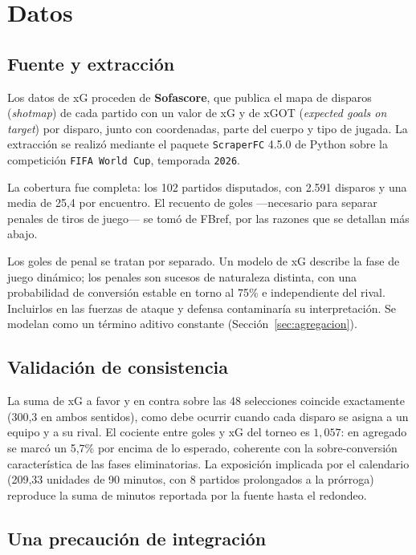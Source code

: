\documentclass[11pt,a4paper]{article}
\begin{document}
\section{Datos}

\subsection{Fuente y extracción}

Los datos de xG proceden de \textbf{Sofascore}, que publica el mapa de disparos (\textit{shotmap}) de cada partido con un valor de xG y de xGOT (\textit{expected goals on target}) por disparo, junto con coordenadas, parte del cuerpo y tipo de jugada. La extracción se realizó mediante el paquete \texttt{ScraperFC} 4.5.0 de Python sobre la competición \texttt{FIFA World Cup}, temporada \texttt{2026}.

La cobertura fue completa: los 102 partidos disputados, con 2.591 disparos y una media de 25{,}4 por encuentro. El recuento de goles ---necesario para separar penales de tiros de juego--- se tomó de FBref, por las razones que se detallan más abajo.

Los goles de penal se tratan por separado. Un modelo de xG describe la fase de juego dinámico; los penales son sucesos de naturaleza distinta, con una probabilidad de conversión estable en torno al 75\% e independiente del rival. Incluirlos en las fuerzas de ataque y defensa contaminaría su interpretación. Se modelan como un término aditivo constante (Sección~\ref{sec:agregacion}).

\subsection{Validación de consistencia}

La suma de xG a favor y en contra sobre las 48 selecciones coincide exactamente (300{,}3 en ambos sentidos), como debe ocurrir cuando cada disparo se asigna a un equipo y a su rival. El cociente entre goles y xG del torneo es $1{,}057$: en agregado se marcó un 5{,}7\% por encima de lo esperado, coherente con la sobre-conversión característica de las fases eliminatorias. La exposición implicada por el calendario (209{,}33 unidades de 90 minutos, con 8 partidos prolongados a la prórroga) reproduce la suma de minutos reportada por la fuente hasta el redondeo.

\subsection{Una precaución de integración}
\end{document}
